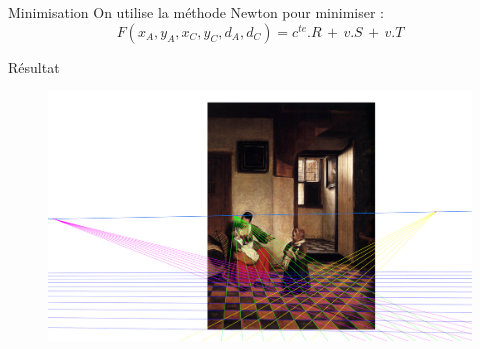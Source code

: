 \documentclass{beamer}
\begin{document}
	\begin{frame}{Minimisation}
		On utilise la méthode Newton pour minimiser :
		$$ F(x_A, y_A, x_C, y_C, d_A, d_C) = c^{te} . R \, + \, v . S \, + \, v . T $$
	\end{frame}

	\begin{frame}{Résultat}
		\begin{figure}[h]
			\centering
			\includegraphics[width=\linewidth]{perf.jpg}
		\end{figure}
	\end{frame}
\end{document}
